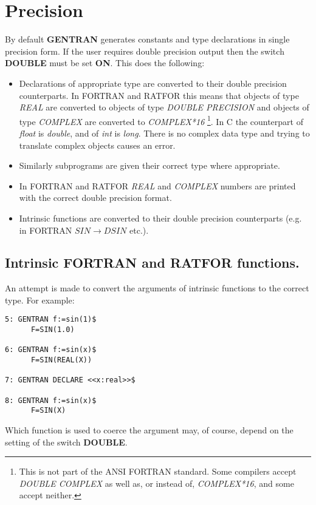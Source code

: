 \section{Precision}
\label{precision}
By default {\bf GENTRAN} generates constants and type declarations in
single precision form.  If the user requires double precision output
then the switch {\bf DOUBLE} must be set {\bf ON}.  This does the
following:
\begin{itemize}
\item Declarations of appropriate type are converted to their double
precision counterparts.  In FORTRAN and RATFOR this means that objects of type
{\it REAL\/} are converted to objects   of type {\it DOUBLE PRECISION\/}
and objects of type {\it COMPLEX\/} are converted to {\it COMPLEX*16\/}
\footnote{This is not part of the ANSI FORTRAN standard.  Some compilers
accept {\it DOUBLE COMPLEX\/} as well as, or instead of, {\it COMPLEX*16\/},
and some accept neither.}.
In C the counterpart of {\it float\/} is {\it double\/}, and of {\it int\/}
is {\it long\/}.  There is no complex data type and trying to translate complex
objects causes an error.
\item Similarly subprograms are given their correct type where appropriate.
\item In FORTRAN and RATFOR {\it REAL\/} and {\it COMPLEX\/} numbers are
printed with the correct double precision format.
\item Intrinsic functions are converted to their double precision counterparts
(e.g. in FORTRAN $SIN \rightarrow DSIN$ etc.).
\end{itemize}

\subsection{Intrinsic FORTRAN and RATFOR functions.}
An attempt is made to convert the arguments of intrinsic functions to
the correct type.  For example:
\begin{verbatim}
5: GENTRAN f:=sin(1)$
      F=SIN(1.0)

6: GENTRAN f:=sin(x)$
      F=SIN(REAL(X))

7: GENTRAN DECLARE <<x:real>>$

8: GENTRAN f:=sin(x)$
      F=SIN(X)
\end{verbatim}
Which function is used to coerce the argument may, of course, depend on the
setting of the switch {\bf DOUBLE}.

